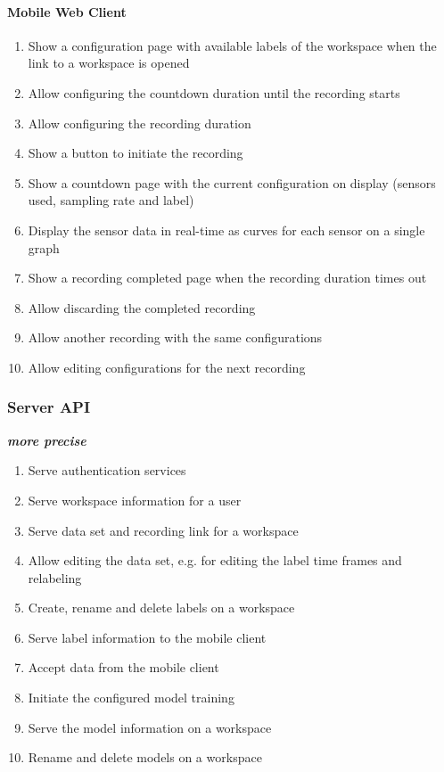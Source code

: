 \paragraph{Mobile Web Client}
\begin{enumerate}[resume*]
    \item Show a configuration page with available labels of the workspace when the link to a workspace is opened
    \item Allow configuring the countdown duration until the recording starts
    \item Allow configuring the recording duration
    \item Show a button to initiate the recording
    \item Show a countdown page with the current configuration on display (sensors used, sampling rate and label)
    \item Display the sensor data in real-time as curves for each sensor on a single graph
    \item Show a recording completed page when the recording duration times out
    \item Allow discarding the completed recording
    \item Allow another recording with the same configurations
    \item Allow editing configurations for the next recording
\end{enumerate}

\subsubsection{Server API} \textbf{\emph{more precise}}
\begin{enumerate}[resume*]
    \item Serve authentication services
    \item Serve workspace information for a user
    \item Serve data set and recording link for a workspace
    \item Allow editing the data set, e.g. for editing the label time frames and relabeling
    \item Create, rename and delete labels on a workspace
    \item Serve label information to the mobile client
    \item Accept data from the mobile client
    \item Initiate the configured model training
    \item Serve the model information on a workspace
    \item Rename and delete models on a workspace
\end{enumerate}

